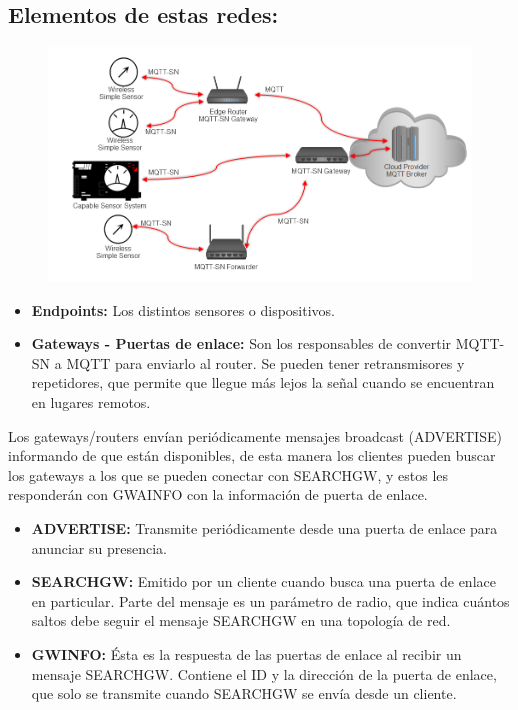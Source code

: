 \documentclass[12pt]{report} %
\begin{document}
\subsection{Elementos de estas redes:}
\begin{figure}[H]
	{\includegraphics[scale=.35]{15a80880-30ad-472a-bf98-254556798207.png}}
\end{figure}
\begin{itemize}
	\item \textbf{Endpoints:} Los distintos sensores o dispositivos.
	\item \textbf{Gateways - Puertas de enlace:} Son los responsables de convertir MQTT-SN a MQTT para enviarlo al router. Se pueden tener retransmisores y repetidores, que permite que llegue más lejos la señal cuando se encuentran en lugares remotos.
\end{itemize}

Los gateways/routers envían periódicamente mensajes broadcast (ADVERTISE) informando de que están disponibles, de esta manera los clientes pueden buscar los gateways a los que se pueden conectar con SEARCHGW, y estos les responderán con GWAINFO con la información de puerta de enlace.
\begin{itemize}
	\item \textbf{ADVERTISE:} Transmite periódicamente desde una puerta de enlace para anunciar su presencia.
	\item \textbf{SEARCHGW:} Emitido por un cliente cuando busca una puerta de enlace en particular. Parte del mensaje es un parámetro de radio, que indica cuántos saltos debe seguir el mensaje SEARCHGW en una topología de red.
	\item \textbf{GWINFO:} Ésta es la respuesta de las puertas de enlace al recibir un mensaje SEARCHGW. Contiene el ID y la dirección de la puerta de enlace, que solo se transmite cuando SEARCHGW se envía desde un cliente.
\end{itemize}
\end{document}
